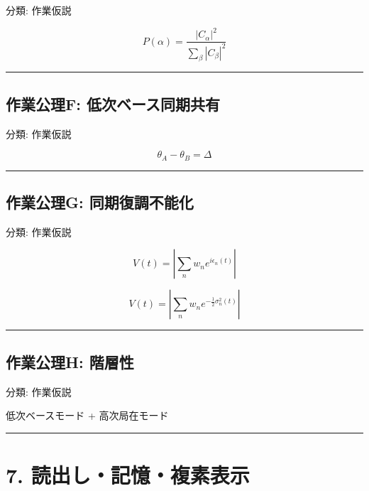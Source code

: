 \documentclass[
  a4paper,
]{ltjsarticle}
\newenvironment{Shaded}{}{}
\newcommand{\NormalTok}[1]{#1}
\begin{document}
分類: 作業仮説

\[
P(\alpha)=\frac{|C_\alpha|^2}{\sum_\beta |C_\beta|^2}
\]

\begin{center}\rule{0.5\linewidth}{0.5pt}\end{center}

\subsection{作業公理F:
低次ベース同期共有}\label{ux4f5cux696dux516cux7406f-ux4f4eux6b21ux30d9ux30fcux30b9ux540cux671fux5171ux6709}

分類: 作業仮説

\[
\theta_A-\theta_B=\Delta
\]

\begin{center}\rule{0.5\linewidth}{0.5pt}\end{center}

\subsection{作業公理G:
同期復調不能化}\label{ux4f5cux696dux516cux7406g-ux540cux671fux5fa9ux8abfux4e0dux80fdux5316}

分類: 作業仮説

\[
V(t)=\left|\sum_n w_n e^{i\epsilon_n(t)}\right|
\]

\[
V(t)=\left|\sum_n w_n e^{-\frac12\sigma_n^2(t)}\right|
\]

\begin{center}\rule{0.5\linewidth}{0.5pt}\end{center}

\subsection{作業公理H:
階層性}\label{ux4f5cux696dux516cux7406h-ux968eux5c64ux6027}

分類: 作業仮説

\begin{Shaded}
\begin{Highlighting}[]
\NormalTok{低次ベースモード}
\NormalTok{+ 高次局在モード}
\end{Highlighting}
\end{Shaded}

\begin{center}\rule{0.5\linewidth}{0.5pt}\end{center}

\section{7.
読出し・記憶・複素表示}\label{ux8aadux51faux3057ux8a18ux61b6ux8907ux7d20ux8868ux793a}
\end{document}
